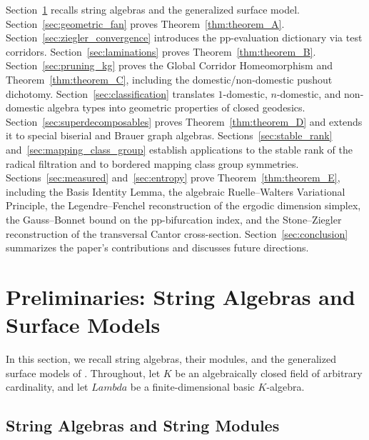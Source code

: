 \documentclass[11pt,a4paper,reqno]{amsart}
\def\mathbb#1{#1}%
\def\K{K}%
\def\Lambda{Lambda}%
\theoremstyle{definition}
\theoremstyle{remark}
\newcommand{\K}{\mathbb{K}}
\begin{document}
Section~\ref{sec:preliminaries} recalls string algebras and the generalized surface model. Section~\ref{sec:geometric_fan} proves Theorem~\ref{thm:theorem_A}. Section~\ref{sec:ziegler_convergence} introduces the pp-evaluation dictionary via test corridors. Section~\ref{sec:laminations} proves Theorem~\ref{thm:theorem_B}. Section~\ref{sec:pruning_kg} proves the Global Corridor Homeomorphism and Theorem~\ref{thm:theorem_C}, including the domestic/non-domestic pushout dichotomy. Section~\ref{sec:classification} translates $1$-domestic, $n$-domestic, and non-domestic algebra types into geometric properties of closed geodesics. Section~\ref{sec:superdecomposables} proves Theorem~\ref{thm:theorem_D} and extends it to special biserial and Brauer graph algebras. Sections~\ref{sec:stable_rank} and~\ref{sec:mapping_class_group} establish applications to the stable rank of the radical filtration and to bordered mapping class group symmetries. Sections~\ref{sec:measured} and~\ref{sec:entropy} prove Theorem~\ref{thm:theorem_E}, including the Basis Identity Lemma, the algebraic Ruelle--Walters Variational Principle, the Legendre--Fenchel reconstruction of the ergodic dimension simplex, the Gauss--Bonnet bound on the pp-bifurcation index, and the Stone--Ziegler reconstruction of the transversal Cantor cross-section. Section~\ref{sec:conclusion} summarizes the paper's contributions and discusses future directions.

\section{Preliminaries: String Algebras and Surface Models}
\label{sec:preliminaries}

In this section, we recall string algebras, their modules, and the generalized surface models of \cite{OPS2018, BCS2020, Brustle2020}. Throughout, let $\K$ be an algebraically closed field of arbitrary cardinality, and let $\Lambda$ be a finite-dimensional basic $\K$-algebra.

\subsection{String Algebras and String Modules}
\label{subsec:string_algebras}
\end{document}
